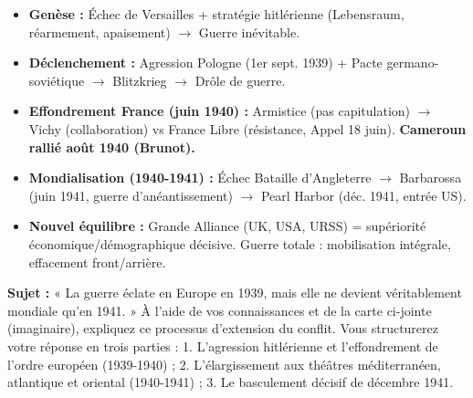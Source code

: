 \documentclass[11pt]{article}
\begin{document}
\begin{aretenir}
\begin{itemize}
\item \textbf{Genèse :} Échec de Versailles + stratégie hitlérienne (Lebensraum, réarmement, apaisement) $\rightarrow$ Guerre inévitable.
\item \textbf{Déclenchement :} Agression Pologne (1er sept. 1939) + Pacte germano-soviétique $\rightarrow$ Blitzkrieg $\rightarrow$ Drôle de guerre.
\item \textbf{Effondrement France (juin 1940) :} Armistice (pas capitulation) $\rightarrow$ Vichy (collaboration) vs France Libre (résistance, Appel 18 juin). \textbf{Cameroun rallié août 1940 (Brunot).}
\item \textbf{Mondialisation (1940-1941) :} Échec Bataille d'Angleterre $\rightarrow$ Barbarossa (juin 1941, guerre d'anéantissement) $\rightarrow$ Pearl Harbor (déc. 1941, entrée US).
\item \textbf{Nouvel équilibre :} Grande Alliance (UK, USA, URSS) = supériorité économique/démographique décisive. Guerre totale : mobilisation intégrale, effacement front/arrière.
\end{itemize}
\end{aretenir}

\begin{exercice}
\textbf{Sujet :} « La guerre éclate en Europe en 1939, mais elle ne devient véritablement mondiale qu'en 1941. » À l'aide de vos connaissances et de la carte ci-jointe (imaginaire), expliquez ce processus d'extension du conflit. Vous structurerez votre réponse en trois parties : 1. L'agression hitlérienne et l'effondrement de l'ordre européen (1939-1940) ; 2. L'élargissement aux théâtres méditerranéen, atlantique et oriental (1940-1941) ; 3. Le basculement décisif de décembre 1941.
\end{exercice}
\end{document}
